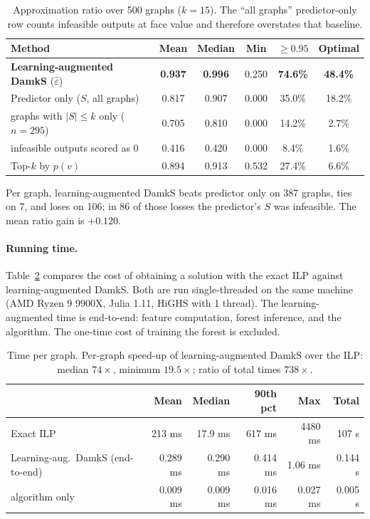 \documentclass[11pt]{article}
\begin{document}
\begin{table}[h]
\centering
\begin{tabular}{lccccc}
\toprule
Method & Mean & Median & Min & $\ge 0.95$ & Optimal \\
\midrule
\textbf{Learning-augmented DamkS} ($\hat\varepsilon$) & \textbf{0.937} & \textbf{0.996} & 0.250 & \textbf{74.6\%} & \textbf{48.4\%} \\
Predictor only ($S$, all graphs)          & 0.817 & 0.907 & 0.000 & 35.0\% & 18.2\% \\
\quad graphs with $|S|\le k$ only ($n=295$) & 0.705 & 0.810 & 0.000 & 14.2\% & 2.7\% \\
\quad infeasible outputs scored as 0      & 0.416 & 0.420 & 0.000 & 8.4\% & 1.6\% \\
Top-$k$ by $p(v)$                         & 0.894 & 0.913 & 0.532 & 27.4\% & 6.6\% \\
\bottomrule
\end{tabular}
\caption{Approximation ratio over 500 graphs ($k=15$). The ``all graphs'' predictor-only row
counts infeasible outputs at face value and therefore overstates that baseline.}
\label{tab:quality}
\end{table}

Per graph, learning-augmented DamkS beats predictor only on 387 graphs, ties on 7, and
loses on 106; in 86 of those losses the predictor's $S$ was infeasible. The mean ratio
gain is $+0.120$.

\paragraph{Running time.} Table~\ref{tab:time} compares the cost of obtaining a solution with
the exact ILP against learning-augmented DamkS. Both are run single-threaded on the same
machine (AMD Ryzen 9 9900X, Julia 1.11, HiGHS with 1 thread). The learning-augmented time is
end-to-end: feature computation, forest inference, and the algorithm. The one-time cost of
training the forest is excluded.

\begin{table}[h]
\centering
\begin{tabular}{lrrrrr}
\toprule
 & Mean & Median & 90th pct & Max & Total \\
\midrule
Exact ILP                                 & 213 ms   & 17.9 ms  & 617 ms   & 4480 ms & 107 s \\
Learning-aug.\ DamkS (end-to-end) & 0.289 ms & 0.290 ms & 0.414 ms & 1.06 ms & 0.144 s \\
\quad algorithm only & 0.009 ms & 0.009 ms & 0.016 ms & 0.027 ms & 0.005 s \\
\bottomrule
\end{tabular}
\caption{Time per graph. Per-graph speed-up of learning-augmented DamkS over the ILP: median
$74\times$, minimum $19.5\times$; ratio of total times $738\times$.}
\label{tab:time}
\end{table}
\end{document}

